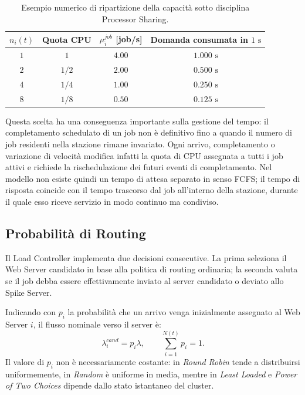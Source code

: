 ﻿\documentclass[a4paper,12pt]{article}
\begin{document}
\begin{table}[H]
    \centering
    \small
    \renewcommand{\arraystretch}{1.2}
    \begin{tabular}{cccc}
        \hline
        \textbf{$n_i(t)$} & \textbf{Quota CPU} & \textbf{$\mu_i^{job}$ [job/s]} & \textbf{Domanda consumata in $1\text{ s}$} \\ \hline
        $1$ & $1$     & $4.00$ & $1.000\text{ s}$ \\
        $2$ & $1/2$   & $2.00$ & $0.500\text{ s}$ \\
        $4$ & $1/4$   & $1.00$ & $0.250\text{ s}$ \\
        $8$ & $1/8$   & $0.50$ & $0.125\text{ s}$ \\ \hline
    \end{tabular}
    \caption{Esempio numerico di ripartizione della capacità sotto disciplina Processor Sharing.}
    \label{tab:ps_example}
\end{table}

Questa scelta ha una conseguenza importante sulla gestione del tempo: il completamento schedulato di un job non è definitivo fino a quando il numero di job residenti nella stazione rimane invariato. Ogni arrivo, completamento o variazione di velocità modifica infatti la quota di CPU assegnata a tutti i job attivi e richiede la rischedulazione dei futuri eventi di completamento. Nel modello non esiste quindi un tempo di attesa separato in senso FCFS; il tempo di risposta coincide con il tempo trascorso dal job all'interno della stazione, durante il quale esso riceve servizio in modo continuo ma condiviso.


\subsection{Probabilità di Routing}
Il Load Controller implementa due decisioni consecutive. La prima seleziona il Web Server candidato in base alla politica di routing ordinaria; la seconda valuta se il job debba essere effettivamente inviato al server candidato o deviato allo Spike Server.

Indicando con $p_i$ la probabilità che un arrivo venga inizialmente assegnato al Web Server $i$, il flusso nominale verso il server è:
\begin{equation}
    \lambda_i^{cand} = p_i \lambda, \qquad \sum_{i=1}^{N(t)} p_i = 1.
\end{equation}
Il valore di $p_i$ non è necessariamente costante: in \textit{Round Robin} tende a distribuirsi uniformemente, in \textit{Random} è uniforme in media, mentre in \textit{Least Loaded} e \textit{Power of Two Choices} dipende dallo stato istantaneo del cluster.
\end{document}
